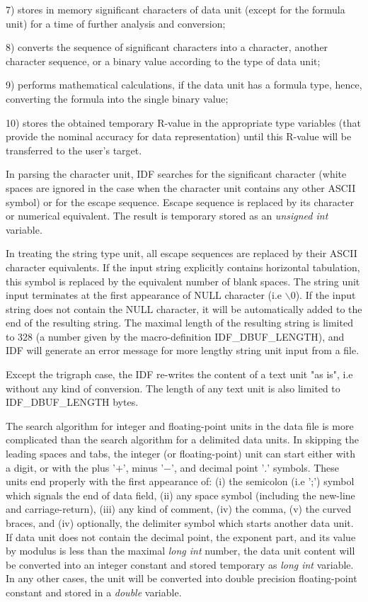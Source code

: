 7) stores in memory significant characters
of data unit (except for the formula unit) 
for a time of further analysis and conversion;

8) converts the sequence of significant characters into
a character, another character sequence, or a binary value
according to the type of data unit;

9) performs  mathematical calculations, if the data unit
has a formula type, hence, converting the formula into
the single binary value; 

10) stores the obtained temporary  R-value in the
appropriate type variables (that provide the nominal accuracy
for data representation) 
until this R-value will be transferred to the user's target.

In parsing the character unit, IDF searches for the significant character
(white spaces are ignored in the case when the character unit contains
any other ASCII symbol) or for the escape sequence. 
Escape sequence is replaced by its character or numerical equivalent.
The result is temporary stored as an {\it unsigned int} variable.

In treating the string type unit, all escape sequences are replaced
by their ASCII character equivalents. If the input string explicitly
contains horizontal tabulation, this symbol is replaced by the equivalent
number of blank spaces. The string unit input terminates at
the first appearance of NULL character (i.e $\backslash 0$). 
If the input string does not contain
the NULL character, it will be automatically added to the end of 
the resulting string. The maximal length of the resulting string
is limited to 328 (a number given by the macro-definition IDF\_DBUF\_LENGTH),
and IDF will generate an error message for more lengthy string unit input
from a file.
 
Except the trigraph case,
the IDF re-writes the content of a text unit "as is",
i.e without any kind of conversion. The length of any text unit
is also limited to IDF\_DBUF\_LENGTH bytes.

The search algorithm for integer and floating-point units in the data file
is more complicated than the search algorithm for a delimited data units.
In skipping the leading spaces and tabs, the integer (or floating-point) unit
can start either with a digit, or with the plus '$+$', minus '$-$',
and decimal point '$.$' symbols.
These units end properly with the first appearance of:
(i) the semicolon (i.e ';') symbol which signals the end of data field,
(ii) any space symbol (including the new-line and carriage-return),
(iii) any kind of comment,
(iv) the comma,
(v) the curved braces, and
(iv) optionally, the delimiter symbol which starts another data unit.
If data unit does not contain the decimal point, the exponent part,
and its value by modulus is less than the maximal {\it long int} number,
the data unit content will be converted into an integer constant
and stored temporary as {\it long int} variable.
In any other cases, the unit will be converted into double precision
floating-point constant and stored in a {\it double} variable.

